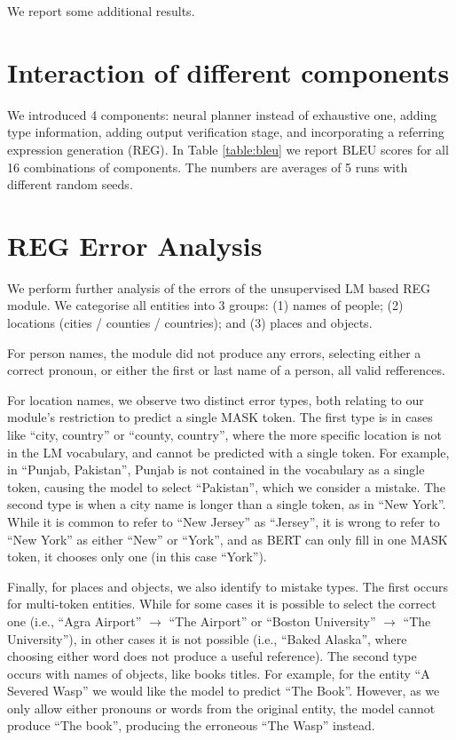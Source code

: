 \documentclass[11pt,a4paper,table,xcdraw]{article}
\begin{document}


\clearpage


\appendix
\appendixpage
\addappheadtotoc


We report some additional results.

\section{Interaction of different components}
We introduced 4 components: neural planner instead of exhaustive one, adding type information, adding output verification stage, and incorporating a referring expression generation (REG). In Table \ref{table:bleu} we report BLEU scores 
 \cite{papineni2002bleu} for all 16 combinations of components. The numbers are averages of 5 runs with different random seeds.


\section{REG Error Analysis}
We perform further analysis of the errors of the unsupervised LM based REG module. We categorise all entities into 3 groups: (1) names of people; (2) locations (cities / counties / countries); and (3) places and objects.

For person names, the module did not produce any errors, selecting either a correct pronoun, or either the first or last name of a person, all valid refferences.

For location names, we observe two distinct error types, both relating to our module's restriction to predict a single MASK token. The first type is in cases like ``city, country'' or ``county, country'', where the more specific location is not in the LM vocabulary, and cannot be predicted with a single token. For example, in ``Punjab, Pakistan'', Punjab is not contained in the vocabulary as a single token, causing the model to select ``Pakistan'', which we consider a mistake. The second type is when a city name is longer than a single token, as in ``New York''. While it is common to refer to ``New Jersey'' as ``Jersey'', it is wrong to refer to ``New York'' as either ``New'' or ``York'', and as BERT can only fill in one MASK token, it chooses only one (in this case ``York'').

Finally, for places and objects, we also identify to mistake types. The first occurs for multi-token entities. While for some cases it is possible to select the correct one (i.e., ``Agra Airport'' $\rightarrow$ ``The Airport'' or ``Boston University'' $\rightarrow$ ``The University''), in other cases it is not possible (i.e., ``Baked Alaska'', where choosing either word does not produce a useful reference). 
The second type occurs with names of objects, like books titles. For example, for the entity ``A Severed Wasp'' we would like the model to predict ``The Book''. However, as we only allow either pronouns or words from the original entity, the model cannot produce ``The book'', producing the erroneous ``The Wasp'' instead.
\end{document}
